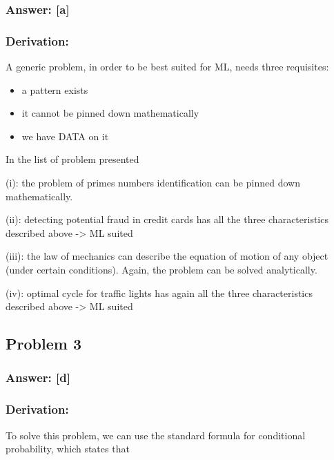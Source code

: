 \documentclass[11pt]{article}
\begin{document}
\hypertarget{answer-a}{%
\subsubsection{Answer: {[}a{]}}\label{answer-a}}

\hypertarget{derivation}{%
\subsubsection{Derivation:}\label{derivation}}

A generic problem, in order to be best suited for ML, needs three
requisites:

\begin{itemize}
\item
  a pattern exists
\item
  it cannot be pinned down mathematically
\item
  we have DATA on it
\end{itemize}

In the list of problem presented

(i): the problem of primes numbers identification can be pinned down
mathematically.

(ii): detecting potential fraud in credit cards has all the three
characteristics described above -\textgreater{} ML suited

(iii): the law of mechanics can describe the equation of motion of any
object (under certain conditions). Again, the problem can be solved
analytically.

(iv): optimal cycle for traffic lights has again all the three
characteristics described above -\textgreater{} ML suited

    \hypertarget{problem-3}{%
\subsection{Problem 3}\label{problem-3}}

\hypertarget{answer-d}{%
\subsubsection{Answer: {[}d{]}}\label{answer-d}}

\hypertarget{derivation}{%
\subsubsection{Derivation:}\label{derivation}}

To solve this problem, we can use the standard formula for conditional
probability, which states that
\end{document}
